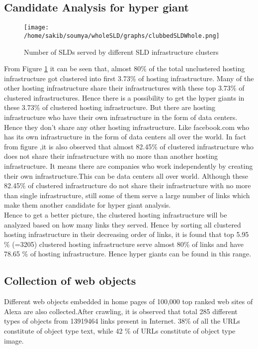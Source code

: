 \subsection{Candidate Analysis for hyper giant}

\begin{figure}[htb]
  \centering
  \texttt{[image: /home/sakib/soumya/wholeSLD/graphs/clubbedSLDWhole.png]}\\
  \caption{Number of SLDs served by different SLD infrastructure clusters}
  \label{fig:SLD}
\end{figure}

\noindent From Figure \ref{fig:SLD} it can be seen that, almost 80\% of the total unclustered hosting infrastructure got clustered into first 3.73\% of hosting infrastructure. Many of the other hosting infrastructure share their infrastructures with these top 3.73\% of clustered infrastructures. Hence there is a possibility to get the hyper giants in these 3.73\% of clustered hosting infrastructure. But there are hosting infrastructure who have their own infrastructure in the form of data centers. Hence they don't share any other hosting infrastructure. Like facebook.com who has its own infrastructure in the form of data centers all over the world. In fact from figure ,it is also observed that almost 82.45\% of clustered infrastructure who does not share their infrastructure with no more than another hosting infrastructure. It means there are companies who work independently by creating their own infrastructure.This can be data centers all over world. Although these 82.45\% of clustered infrastructure do not share their infrastructure with no more than single infrastructure, still some of them serve a large number of links which make them another candidate for hyper giant analysis.\\

\noindent Hence to get a better picture, the clustered hosting infrastructure will be analyzed based on how many links they served. Hence by sorting all clustered hosting infrastructure in their decreasing order of links, it is found that top 5.95 \% (=3205) clustered hosting infrastructure serve almost 80\% of links and have 78.65 \% of hosting infrastructure. Hence hyper giants can be found in this range.\\

\subsection{Collection of web objects}
\noindent Different web objects embedded in home pages of 100,000 top ranked web sites of Alexa are also collected.After crawling, it is observed that total 285 different types of objects from 13919464 links present in Internet. 38\% of all the URLs constitute of object type text, while 42 \% of URLs constitute of object type image.\\

